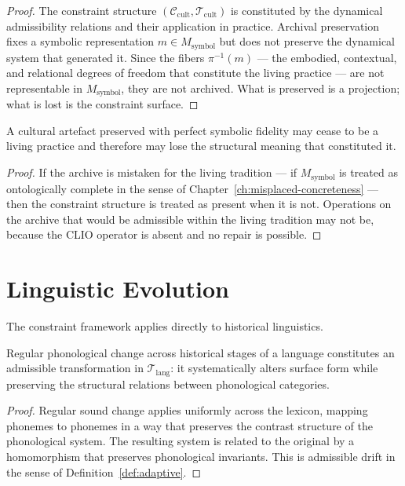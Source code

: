 \documentclass[11pt,openany]{book}
\begin{document}
\begin{proof}
The constraint structure $(\mathcal{C}_{\mathrm{cult}},
\mathcal{T}_{\mathrm{cult}})$ is constituted by the
dynamical admissibility relations and their application
in practice.  Archival preservation fixes a symbolic
representation $m \in M_{\mathrm{symbol}}$ but does not
preserve the dynamical system that generated it.  Since the
fibers $\pi^{-1}(m)$ — the embodied, contextual, and
relational degrees of freedom that constitute the living
practice — are not representable in $M_{\mathrm{symbol}}$,
they are not archived.  What is preserved is a projection;
what is lost is the constraint surface.
\end{proof}

\begin{corollary}
\label{cor:recording}
A cultural artefact preserved with perfect symbolic fidelity
may cease to be a living practice and therefore may lose
the structural meaning that constituted it.
\end{corollary}

\begin{proof}
If the archive is mistaken for the living tradition — if
$M_{\mathrm{symbol}}$ is treated as ontologically complete
in the sense of Chapter~\ref{ch:misplaced-concreteness} —
then the constraint structure is treated as present when it
is not.  Operations on the archive that would be admissible
within the living tradition may not be, because the
CLIO operator is absent and no repair is possible.
\end{proof}

\section{Linguistic Evolution}
\label{sec:linguistics}

The constraint framework applies directly to historical
linguistics.

\begin{proposition}
\label{prop:phonological}
Regular phonological change across historical stages of a
language constitutes an admissible transformation in
$\mathcal{T}_{\mathrm{lang}}$: it systematically alters
surface form while preserving the structural relations
between phonological categories.
\end{proposition}

\begin{proof}
Regular sound change applies uniformly across the lexicon,
mapping phonemes to phonemes in a way that preserves the
contrast structure of the phonological system.  The
resulting system is related to the original by a
homomorphism that preserves phonological invariants.  This
is admissible drift in the sense of
Definition~\ref{def:adaptive}.
\end{proof}
\end{document}

